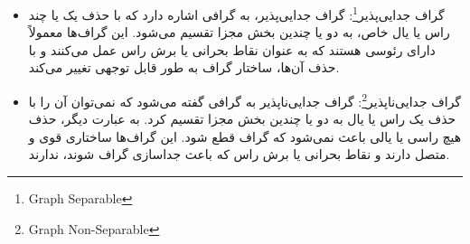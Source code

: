 \documentclass[a4paper,10pt]{article}
\begin{document}
\begin{itemize}
        یک مجموعه برش در گراف $G$ مجموعه‌ای از یال‌ها $F$ است که با حذف آن‌ها گراف قطع می‌شود، به شرطی که حذف هیچ زیرمجموعه مناسب\footnote{\hspace{2pt}Subset Proper} از $F$ نتواند گراف را قطع کند. این مجموعه برش حداقلی یا برش ساده\footnote{\hspace{2pt}Cut-Set Simple} نیز نامیده می‌شود. همچنین به عنوان برش مناسب یا چرخه مشترک\footnote{\hspace{2pt}Cocycle} نیز شناخته می‌شود.

        \item گراف جدایی‌پذیر\footnote{\hspace{2pt}Graph Separable}: گراف جدایی‌پذیر، به گرافی اشاره دارد که با حذف یک یا چند راس یا یال خاص، به دو یا چندین بخش مجزا تقسیم می‌شود. این گراف‌ها معمولاً دارای رئوسی هستند که به عنوان نقاط بحرانی یا برش راس عمل می‌کنند و با حذف آن‌ها، ساختار گراف به طور قابل توجهی تغییر می‌کند.

        \begin{center}
            

        \end{center}

        \item گراف جدایی‌ناپذیر\footnote{\hspace{2pt}Graph Non-Separable}: گراف جدایی‌ناپذیر به گرافی گفته می‌شود که نمی‌توان آن را با حذف یک راس یا یال به دو یا چندین بخش مجزا تقسیم کرد. به عبارت دیگر، حذف هیچ راسی یا یالی باعث نمی‌شود که گراف قطع شود. این گراف‌ها ساختاری قوی و متصل دارند و نقاط بحرانی یا برش راس که باعث جداسازی گراف شوند، ندارند.


\end{itemize}
\end{document}
